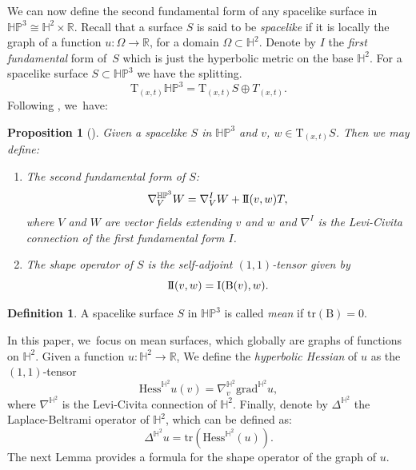 \documentclass[JEP,XML,SOM,Unicode,NoEqCountersInSection, NoFloatCountersInSection,published]{cedram}
\theoremstyle{plain}
\newtheorem{prop}[cor]{Proposition}
\theoremstyle{definition}
\newtheorem{defi}[cor]{Definition}
\newcommand{\HP}{\mathbb{HP}^3}
\newcommand{\I}{\mathrm{I}}
\newcommand{\II}{\mathrm{I}\hspace{-0.04cm}\mathrm{I}}
\newcommand{\hess}{\mathrm{Hess}^{\mathbb{H}^2}}
\newcommand{\B}{\mathrm{B}}
\begin{document}
We can now define the second fundamental form of any spacelike surface in $\HP\cong\mathbb{H}^2\times\mathbb{R}$. Recall that a surface $S$ is said to be \emph{spacelike} if it is locally the graph of a function $u : \Omega \to\mathbb{R}$, for a domain $\Omega\subset \mathbb{H}^2$. Denote by $I$ the \emph{first fundamental} form of~$S$ which is just the hyperbolic metric on the base $\mathbb{H}^2$. For a spacelike surface $S\subset\HP$ we have the splitting.
\begin{equation}\label{splittingconnection}
\mathrm{T}_{(x,t)}\HP=\mathrm{T}_{(x,t)}S\oplus T_{(x,t)}.
\end{equation}
Following \cite{fillastreseppi}, we~have:
\begin{prop}[\cite{fillastreseppi}]
Given a spacelike $S$ in $\HP$ and $v$, $w\in\mathrm{T}_{(x,t)}S$. Then we may define:
\begin{enumerate}
\item The \emph{second fundamental form} of $S$:
\[
\nabla_V^{\HP}W=\nabla_V^{I}W+\II(v,w) T,
\]
where $V$ and $W$ are vector fields extending $v$ and $w$ and $\nabla^{I}$ is the Levi-Civita connection of the first fundamental form $I$.
\item The \emph{shape operator} of $S$ is the self-adjoint $(1, 1)$-tensor given by
\[
\II(v,w)=\I(\B(v),w).
\]
\end{enumerate}
\end{prop}
\begin{defi}\label{def_mean_surface}
A spacelike surface $S$ in $\HP$ is called \emph{mean} if $\mathrm{tr}(\B) = 0$.
\end{defi}
In this paper, we~focus on mean surfaces, which globally are graphs of functions on $\mathbb{H}^2$. Given a function $u:\mathbb{H}^2\to \mathbb{R}$, We define the \emph{hyperbolic Hessian} of $u$ as the $(1, 1)$-tensor
\[
\hess u(v)=\nabla^{\mathbb{H}^2}_v\mathrm{grad}^{\mathbb{H}^2} u,
\]
where $\nabla^{\mathbb{H}^2}$ is the Levi-Civita connection of $\mathbb{H}^2$. Finally, denote by $\Delta^{\mathbb{H}^2}$ the Laplace-Beltrami operator of $\mathbb{H}^2$, which can be defined as:
\[
\Delta^{\mathbb{H}^2}u=\mathrm{tr}(\hess(u)).
\]
The next Lemma provides a formula for the shape operator of the graph of $u$.
\end{document}
